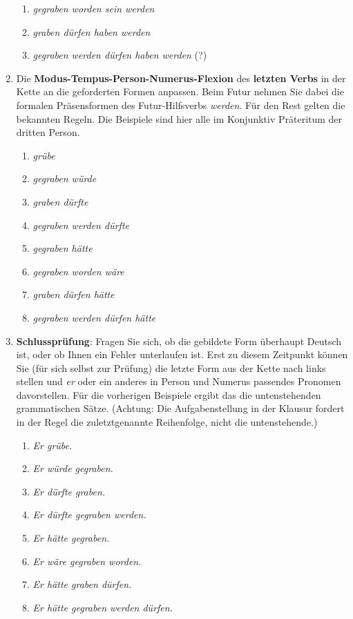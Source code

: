 \begin{enumerate}
\begin{enumerate}
      \item \textit{gegraben worden sein werden}
      \item \textit{graben dürfen haben werden}
      \item \textit{gegraben werden dürfen haben werden} (?)
    \end{enumerate}
  \item Die \textbf{Modus-Tempus-Person-Numerus-Flexion} des \textbf{letzten Verbs} in der Kette an die geforderten Formen anpassen. Beim Futur nehmen Sie dabei die formalen Präsensformen des Futur-Hilfsverbs \textit{werden}. Für den Rest gelten die bekannten Regeln. Die Beispiele sind hier alle im Konjunktiv Präteritum der dritten Person.
    \begin{enumerate}
      \item \textit{grübe}
      \item \textit{gegraben würde}
      \item \textit{graben dürfte}
      \item \textit{gegraben werden dürfte}
      \item \textit{gegraben hätte}
      \item \textit{gegraben worden wäre}
      \item \textit{graben dürfen hätte}
      \item \textit{gegraben werden dürfen hätte}
    \end{enumerate} 
  \item \textbf{Schlussprüfung}: Fragen Sie sich, ob die gebildete Form überhaupt Deutsch ist, oder ob Ihnen ein Fehler unterlaufen ist. Erst zu diesem Zeitpunkt können Sie (für sich selbst zur Prüfung) die letzte Form aus der Kette nach links stellen und \textit{er} oder ein anderes in Person und Numerus passendes Pronomen davorstellen. Für die vorherigen Beispiele ergibt das die untenstehenden grammatischen Sätze. (Achtung: Die Aufgabenstellung in der Klausur fordert in der Regel die zuletztgenannte Reihenfolge, nicht die untenstehende.)
    \begin{enumerate}
      \item \textit{Er grübe.}
      \item \textit{Er würde gegraben.}
      \item \textit{Er dürfte graben.}
      \item \textit{Er dürfte gegraben werden.}
      \item \textit{Er hätte gegraben.}
      \item \textit{Er wäre gegraben worden.}
      \item \textit{Er hätte graben dürfen.}
      \item \textit{Er hätte gegraben werden dürfen.}
    \end{enumerate}
\end{enumerate}

